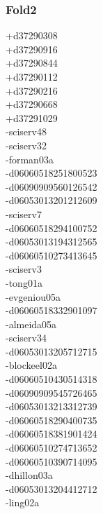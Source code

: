\begin{multicols}{3}
\subsubsection*{Fold2}
+d37290308\\
+d37290916\\
+d37290844\\
+d37290112\\
+d37290216\\
+d37290668\\
+d37291029\\
-sciserv48\\
-sciserv32\\
-forman03a\\
-d06060518251800523\\
-d06090909560126542\\
-d06053013201212609\\
-sciserv7\\
-d06060518294100752\\
-d06053013194312565\\
-d06060510273413645\\
-sciserv3\\
-tong01a\\
-evgeniou05a\\
-d06060518332901097\\
-almeida05a\\
-sciserv34\\
-d06053013205712715\\
-blockeel02a\\
-d06060510430514318\\
-d06090909545726465\\
-d06053013213312739\\
-d06060518290400735\\
-d06060518381901424\\
-d06060510274713652\\
-d06060510390714095\\
-dhillon03a\\
-d06053013204412712\\
-ling02a\\

\end{multicols}

